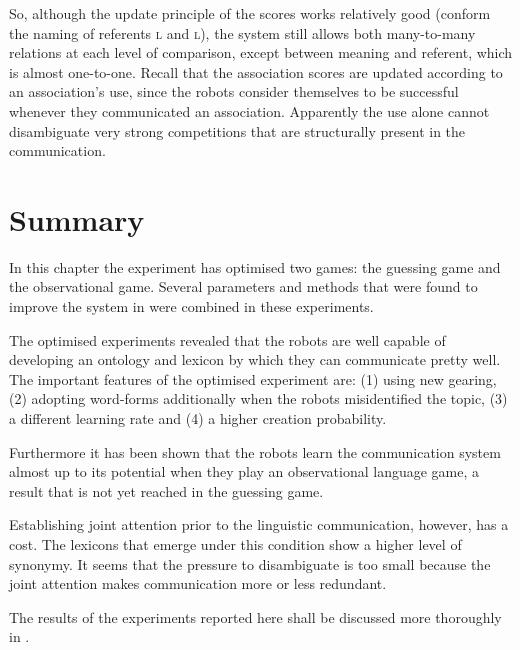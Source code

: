 So, although the update principle of the scores works relatively good (conform the naming of referents \textsc{l} and \textsc{l}), the system still allows both many-to-many relations at each level of comparison, except between meaning and referent, which is almost one-to-one. Recall that the association scores are updated according to an association's use, since the robots consider themselves to be successful whenever they communicated an association. Apparently the use alone cannot disambiguate very strong competitions that are structurally present in the communication.

\section{Summary}

In this chapter the experiment has optimised two games: the guessing game and the observational game. Several parameters and methods that were found to improve the system in  were combined in these experiments.

The optimised experiments revealed that the robots are well capable of developing an ontology and lexicon by which they can communicate pretty well. The important features of the optimised experiment are: (1) using new gearing, (2) adopting word-forms additionally when the robots misidentified the topic, (3) a different learning rate and (4) a higher creation probability. 

Furthermore it has been shown that the robots learn the communication system almost up to its potential when they play an observational language game, a result that is not yet reached in the guessing game. 

Establishing joint attention prior to the linguistic communication, however, has a cost. The lexicons that emerge under this condition show a higher level of synonymy. It seems that the pressure to disambiguate is too small because the joint attention makes communication more or less redundant. 

The results of the experiments reported here shall be discussed more thoroughly in .